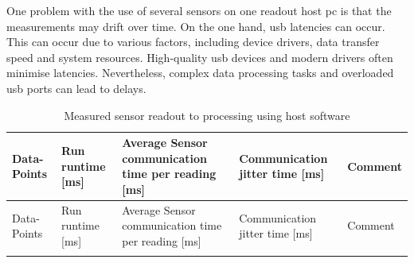One problem with the use of several sensors on one readout host \gls{pc}
is that the measurements may drift over time. On the one hand, \gls{usb}
latencies can occur. This can occur due to various factors, including
device drivers, data transfer speed and system resources. High-quality
\gls{usb} devices and modern drivers often minimise latencies.
Nevertheless, complex data processing tasks and overloaded \gls{usb}
ports can lead to delays.

\begin{longtable}[]{@{}lllll@{}}
\caption{Measured sensor readout to processing using host software
\label{Measured_sensor_readout_to_processing_using_host_software.csv}}\tabularnewline
\toprule
\begin{minipage}[b]{0.08\columnwidth}\raggedright
Data-Points\strut
\end{minipage} & \begin{minipage}[b]{0.11\columnwidth}\raggedright
Run runtime {[}ms{]}\strut
\end{minipage} & \begin{minipage}[b]{0.35\columnwidth}\raggedright
Average Sensor communication time per reading {[}ms{]}\strut
\end{minipage} & \begin{minipage}[b]{0.22\columnwidth}\raggedright
Communication jitter time {[}ms{]}\strut
\end{minipage} & \begin{minipage}[b]{0.10\columnwidth}\raggedright
Comment\strut
\end{minipage}\tabularnewline
\midrule
\endfirsthead
\toprule
\begin{minipage}[b]{0.08\columnwidth}\raggedright
Data-Points\strut
\end{minipage} & \begin{minipage}[b]{0.11\columnwidth}\raggedright
Run runtime {[}ms{]}\strut
\end{minipage} & \begin{minipage}[b]{0.35\columnwidth}\raggedright
Average Sensor communication time per reading {[}ms{]}\strut
\end{minipage} & \begin{minipage}[b]{0.22\columnwidth}\raggedright
Communication jitter time {[}ms{]}\strut
\end{minipage} & \begin{minipage}[b]{0.10\columnwidth}\raggedright
Comment\strut
\end{minipage}\tabularnewline
\midrule
\endhead
\begin{minipage}[t]{0.08\columnwidth}\raggedright

\end{minipage}
\end{longtable}
